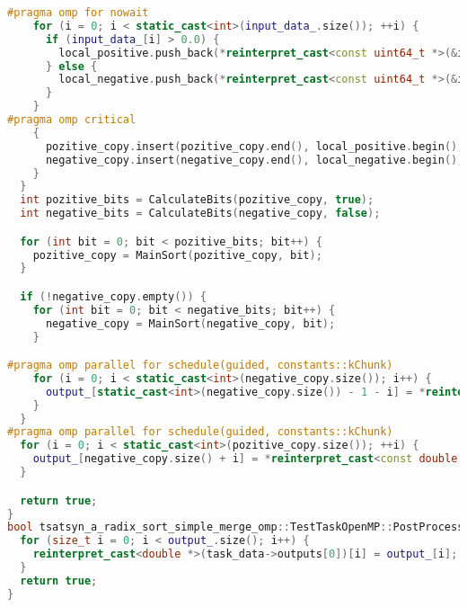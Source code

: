 \documentclass[a4paper,12pt]{article}
\begin{document}
\begin{lstlisting}[language=C++,
    breaklines=true,       % Автоматический перенос строк
    basicstyle=\small\ttfamily, % Уменьшенный шрифт
    columns=fullflexible ]
#pragma omp for nowait
    for (i = 0; i < static_cast<int>(input_data_.size()); ++i) {
      if (input_data_[i] > 0.0) {
        local_positive.push_back(*reinterpret_cast<const uint64_t *>(&input_data_[i]));
      } else {
        local_negative.push_back(*reinterpret_cast<const uint64_t *>(&input_data_[i]));
      }
    }
#pragma omp critical
    {
      pozitive_copy.insert(pozitive_copy.end(), local_positive.begin(), local_positive.end());
      negative_copy.insert(negative_copy.end(), local_negative.begin(), local_negative.end());
    }
  }
  int pozitive_bits = CalculateBits(pozitive_copy, true);
  int negative_bits = CalculateBits(negative_copy, false);

  for (int bit = 0; bit < pozitive_bits; bit++) {
    pozitive_copy = MainSort(pozitive_copy, bit);
  }

  if (!negative_copy.empty()) {
    for (int bit = 0; bit < negative_bits; bit++) {
      negative_copy = MainSort(negative_copy, bit);
    }

#pragma omp parallel for schedule(guided, constants::kChunk)
    for (i = 0; i < static_cast<int>(negative_copy.size()); i++) {
      output_[static_cast<int>(negative_copy.size()) - 1 - i] = *reinterpret_cast<const double *>(&negative_copy[i]);
    }
  }
#pragma omp parallel for schedule(guided, constants::kChunk)
  for (i = 0; i < static_cast<int>(pozitive_copy.size()); ++i) {
    output_[negative_copy.size() + i] = *reinterpret_cast<const double *>(&pozitive_copy[i]);
  }

  return true;
}
bool tsatsyn_a_radix_sort_simple_merge_omp::TestTaskOpenMP::PostProcessingImpl() {
  for (size_t i = 0; i < output_.size(); i++) {
    reinterpret_cast<double *>(task_data->outputs[0])[i] = output_[i];
  }
  return true;
}
    \end{lstlisting}
\end{document}

